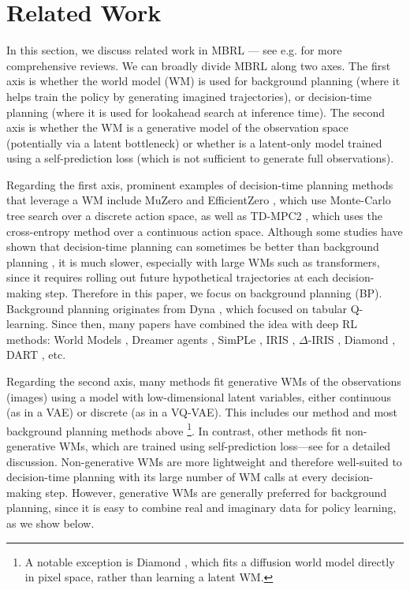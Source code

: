 \section{Related Work}
\label{sec:related}

In this section, we discuss related work in MBRL --- see e.g. \citet{Moerland2023,murphy2024reinforcement, awesome_mbrl} 
for more comprehensive reviews.
We can broadly divide MBRL along two axes.
The first axis is whether the world model (WM) is used for background planning
(where it helps train the policy by generating imagined trajectories),
or decision-time planning (where it is used for lookahead search at inference time). 
The second axis is whether the WM is a generative model of the observation space (potentially via a latent bottleneck) or whether is a latent-only model trained using a self-prediction loss
(which is not sufficient to generate full observations).

Regarding the first axis, prominent examples of decision-time planning methods that leverage a WM include MuZero \citep{schrittwieser2020mastering} and EfficientZero  \citep{Ye2021}, which use Monte-Carlo tree search over a discrete action space, as well as TD-MPC2 \citep{Hansen2024}, which uses the cross-entropy method over a continuous action space.
Although some studies have shown that decision-time planning can sometimes be better
than background planning \citep{Alver2024}, it is much slower, especially with large WMs such as transformers, since it requires rolling out future hypothetical trajectories at each decision-making step.
Therefore in this paper, we focus on background planning (BP).
Background planning originates from Dyna \citep{sutton1990integrated}, which focused on tabular Q-learning.
Since then, many papers have combined the idea with deep RL methods: World Models \citep{ha2018recurrent},
Dreamer agents  \citep{Hafner2020, hafner2020mastering,hafner2023mastering},
SimPLe \citep{Kaiser2019},
IRIS \citep{micheli2022transformers},
$\Delta$-IRIS \citep{micheli2024efficient},
Diamond \citep{alonso2024diffusion},
DART \citep{agarwal2024learning}, etc.

Regarding the second axis, 
many methods fit generative WMs of the
observations (images) using a 
model with low-dimensional latent variables,
either continuous (as in a VAE)
or discrete (as in a VQ-VAE).
This includes our method and most background planning methods above
\footnote{
%
A notable exception is 
Diamond \citep{alonso2024diffusion},
which fits a diffusion world model
directly in pixel space,
rather than learning a latent WM. %
}.
In contrast, other methods fit non-generative WMs, which are trained using self-prediction loss---see \citet{Ni2024} for a detailed discussion.
Non-generative WMs are more lightweight and therefore well-suited to decision-time planning with its large number of WM calls at every decision-making step.
However,
generative WMs are generally preferred for background planning, since it is easy to combine real and imaginary data for policy learning,
as we show below.

